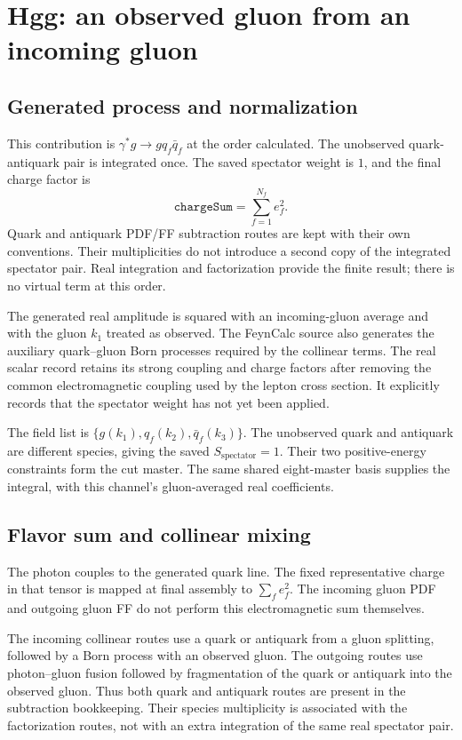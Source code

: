 \documentclass[11pt,a4paper]{article}
\begin{document}
\section{Hgg: an observed gluon from an incoming gluon}
\label{sec:hgg}

\subsection{Generated process and normalization}

This contribution is $\gamma^*g\to gq_f\bar q_f$ at the order calculated.
The unobserved quark-antiquark pair is integrated once. The saved spectator
weight is $1$, and the final charge factor is
\begin{equation}
 \texttt{chargeSum}=\sum_{f=1}^{N_f}e_f^2.
\end{equation}
Quark and antiquark PDF/FF subtraction routes are kept with their own
conventions. Their multiplicities do not introduce a second copy of the
integrated spectator pair. Real integration and factorization provide the
finite result; there is no virtual term at this order.

The generated real amplitude is squared with an incoming-gluon average
and with the gluon $k_1$ treated as observed. The FeynCalc source also
generates the auxiliary quark--gluon Born processes required by the
collinear terms. The real scalar record retains its strong coupling and
charge factors after removing the common electromagnetic coupling used
by the lepton cross section. It explicitly records that the spectator
weight has not yet been applied.

The field list is $\{g(k_1),q_f(k_2),\bar q_f(k_3)\}$. The
unobserved quark and antiquark are different species, giving the saved
$S_{\mathrm{spectator}}=1$. Their two positive-energy constraints form
the cut master. The same shared eight-master basis supplies the integral,
with this channel's gluon-averaged real coefficients.

\subsection{Flavor sum and collinear mixing}

The photon couples to the generated quark line. The fixed representative
charge in that tensor is mapped at final assembly to
$\sum_f e_f^2$. The incoming gluon PDF and outgoing gluon FF do not
perform this electromagnetic sum themselves.

The incoming collinear routes use a quark or antiquark from a gluon
splitting, followed by a Born process with an observed gluon. The
outgoing routes use photon--gluon fusion followed by fragmentation of
the quark or antiquark into the observed gluon. Thus both quark and
antiquark routes are present in the subtraction bookkeeping. Their
species multiplicity is associated with the factorization routes, not
with an extra integration of the same real spectator pair.
\end{document}
